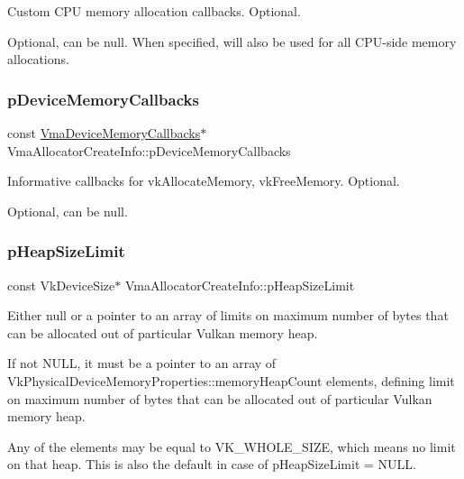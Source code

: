 Custom C\+PU memory allocation callbacks. Optional. 

Optional, can be null. When specified, will also be used for all C\+P\+U-\/side memory allocations. \mbox{\label{structVmaAllocatorCreateInfo_af1380969b5e1ea4c3184a877892d260e}} 
\subsubsection{\texorpdfstring{p\+Device\+Memory\+Callbacks}{pDeviceMemoryCallbacks}}
{\footnotesize\ttfamily const \hyperlink{structVmaDeviceMemoryCallbacks}{Vma\+Device\+Memory\+Callbacks}$\ast$ Vma\+Allocator\+Create\+Info\+::p\+Device\+Memory\+Callbacks}



Informative callbacks for {\ttfamily vk\+Allocate\+Memory}, {\ttfamily vk\+Free\+Memory}. Optional. 

Optional, can be null. \mbox{\label{structVmaAllocatorCreateInfo_a31c192aa6cbffa33279f6d9f0c47c44b}} 
\subsubsection{\texorpdfstring{p\+Heap\+Size\+Limit}{pHeapSizeLimit}}
{\footnotesize\ttfamily const Vk\+Device\+Size$\ast$ Vma\+Allocator\+Create\+Info\+::p\+Heap\+Size\+Limit}



Either null or a pointer to an array of limits on maximum number of bytes that can be allocated out of particular Vulkan memory heap. 

If not N\+U\+LL, it must be a pointer to an array of {\ttfamily Vk\+Physical\+Device\+Memory\+Properties\+::memory\+Heap\+Count} elements, defining limit on maximum number of bytes that can be allocated out of particular Vulkan memory heap.

Any of the elements may be equal to {\ttfamily V\+K\+\_\+\+W\+H\+O\+L\+E\+\_\+\+S\+I\+ZE}, which means no limit on that heap. This is also the default in case of {\ttfamily p\+Heap\+Size\+Limit} = N\+U\+LL.


